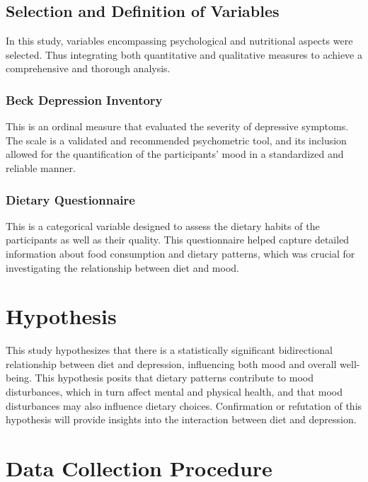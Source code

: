\documentclass[jou]{apa7}
\begin{document}
\subsection{Selection and Definition of Variables}\label{selecciuxf3n-y-definiciuxf3n-de-variables}

In this study, variables encompassing psychological and nutritional aspects were selected. Thus integrating both quantitative and qualitative measures to achieve a comprehensive and thorough analysis.\\

\subsubsection{Beck Depression Inventory}
This is an ordinal measure that evaluated the severity of depressive symptoms. The scale is a validated and recommended psychometric tool, and its inclusion allowed for the quantification of the participants' mood in a standardized and reliable manner.

\subsubsection{Dietary Questionnaire}
This is a categorical variable designed to assess the dietary habits of the participants as well as their quality. This questionnaire helped capture detailed information about food consumption and dietary patterns, which was crucial for investigating the relationship between diet and mood.

\section{Hypothesis}\label{hipuxf3tesis}

This study hypothesizes that there is a statistically significant bidirectional relationship between diet and depression, influencing both mood and overall well-being. This hypothesis posits that dietary patterns contribute to mood disturbances, which in turn affect mental and physical health, and that mood disturbances may also influence dietary choices. Confirmation or refutation of this hypothesis will provide insights into the interaction between diet and depression.

\section{Data Collection Procedure}\label{procedimiento-para-recolecciuxf3n-de-datos}
\end{document}
